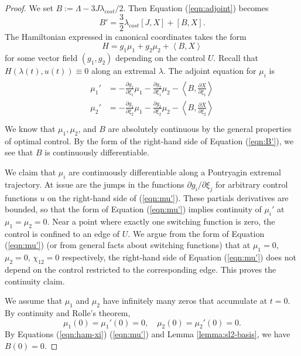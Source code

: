 \documentclass{article}
\theoremstyle{remark}
\newcommand{\ang}[1]{\left\langle{#1}\right\rangle}
\newcommand{\partials}[2]{\frac{\partial #1}{\partial #2}}
\begin{document}
\begin{proof}
 We set $B:= \Lambda - 3 J \lambda_{cost}/2$.  Then Equation
 (\ref{eqn:adjoint}) becomes
\begin{equation}\label{eqn:B'}
B' = \frac{3}{2} \lambda_{cost} [J,X] + [B,X].
\end{equation}
The Hamiltonian expressed in canonical coordinates takes the form
\begin{equation}\label{eqn:ham-xi}
H = g_1 \mu_1 + g_2 \mu_2 + \ang{B,X}
\end{equation}
for some vector field $(g_1,g_2)$ depending on the control $U$.
Recall that $H(\lambda(t),u(t))\equiv 0$ along an extremal $\lambda$.
The adjoint equation for $\mu_i$ is
\begin{align}\label{eqn:mu'}
\begin{split}
\mu_1' &= -\partials{g_1}{\xi_1} \mu_1 - 
\partials{g_2}{\xi_1} \mu_2 -\ang{B,\partials{ X}{ \xi_1}}\\
\mu_2' &= -\partials{g_1}{\xi_2} \mu_1 - 
\partials{g_2}{\xi_2} \mu_2 -\ang{B,\partials{ X}{ \xi_2}}\\
\end{split}
\end{align}
We know that $\mu_1,\mu_2$, and $B$ are absolutely continuous by the
general properties of optimal control.  By the form of the right-hand
side of Equation (\ref{eqn:B'}), we see that $B$ is continuously
differentiable.

We claim that $\mu_i$ are continuously differentiable along a
Pontryagin extremal trajectory.  At issue are the jumps in the
functions ${\partial g_i}/{\partial \xi_j}$ for arbitrary control
functions $u$ on the right-hand side of (\ref{eqn:mu'}).  These
partials derivatives are bounded, so that the form of Equation
(\ref{eqn:mu'}) implies continuity of $\mu_i'$ at $\mu_1=\mu_2=0$.
Near a point where exactly one switching function is zero, the control
is confined to an edge of $U$.  We argue from the form of Equation
(\ref{eqn:mu'}) (or from general facts about switching functions) that
at $\mu_1=0$, $\mu_2=0$, $\chi_{12}=0$ respectively, the right-hand
side of Equation (\ref{eqn:mu'}) does not depend on the control
restricted to the corresponding edge.  This proves the continuity
claim.

We assume that $\mu_1$ and $\mu_2$ have infinitely many zeros 
that accumulate at
$t=0$.  By continuity and Rolle's theorem,
\[
\mu_1(0)=\mu_1'(0)=0,\quad\mu_2(0)=\mu_2'(0)=0.
\]
By Equations (\ref{eqn:ham-xi}) (\ref{eqn:mu'}) and Lemma
\ref{lemma:sl2-basis}, we have $B(0)=0$.


\end{proof}
\end{document}
